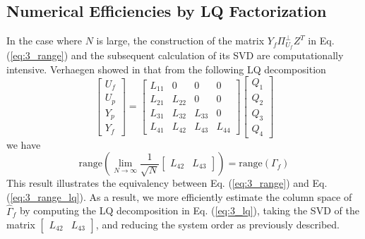\subsection{Numerical Efficiencies by LQ Factorization}
In the case where $N$ is large, the construction of the matrix $Y_f\Pi_{U_f}^\perp Z^T$ in Eq. (\ref{eq:3_range}) and the subsequent calculation of its SVD are computationally intensive. Verhaegen showed in \cite{verhaegen1994identification} that from the following LQ decomposition
\begin{equation}\label{eq:3_lq}
\begin{bmatrix}U_f\\ U_p\\ Y_p\\ Y_f\end{bmatrix} = 
\begin{bmatrix}
	L_{11} & 0 & 0 & 0\\
	L_{21} & L_{22} & 0 & 0\\
	L_{31} & L_{32} & L_{33} & 0\\
	L_{41} & L_{42} & L_{43} & L_{44}
\end{bmatrix}
\begin{bmatrix}Q_1\\ Q_2\\ Q_3\\ Q_4\end{bmatrix}
\end{equation}
we have
\begin{equation}\label{eq:3_range_lq}
\mbox{range}\left(\lim_{N\rightarrow\infty} \frac{1}{\sqrt{N}} \begin{bmatrix}L_{42} & L_{43}\end{bmatrix}\right) = \mbox{range}\left(\Gamma_f\right)
\end{equation}
This result illustrates the equivalency between Eq. (\ref{eq:3_range}) and Eq. (\ref{eq:3_range_lq}). As a result, we more efficiently estimate the column space of $\hat{\Gamma}_f$ by computing the LQ decomposition in Eq. (\ref{eq:3_lq}), taking the SVD of the matrix $\begin{bmatrix}L_{42} & L_{43}\end{bmatrix}$, and reducing the system order as previously described.









